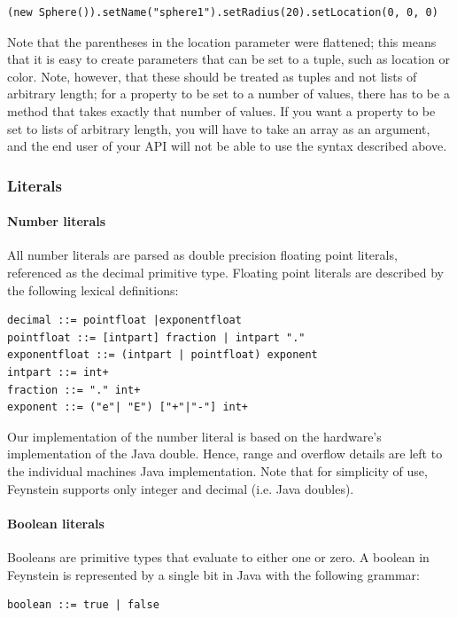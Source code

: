 \begin{verbatim}
(new Sphere()).setName("sphere1").setRadius(20).setLocation(0, 0, 0)
\end{verbatim}

Note that the parentheses in the location parameter were flattened;
this means that it is easy to create parameters that can be set to a
tuple, such as location or color. Note, however, that these should be
treated as tuples and not lists of arbitrary length; for a property to
be set to a number of values, there has to be a method that takes
exactly that number of values. If you want a property to be set to
lists of arbitrary length, you will have to take an array as an
argument, and the end user of your API will not be able to use the
syntax described above.

\subsubsection{Literals}
 
\paragraph{Number literals}
\label{sec:numliterals}
All number literals are parsed as double precision floating point
literals, referenced as the decimal primitive type. Floating point
literals are described by the following lexical definitions:

\begin{verbatim}
decimal ::= pointfloat |exponentfloat
pointfloat ::= [intpart] fraction | intpart "."
exponentfloat ::= (intpart | pointfloat) exponent
intpart ::= int+
fraction ::= "." int+
exponent ::= ("e"| "E") ["+"|"‐"] int+
\end{verbatim}

Our implementation of the number literal is based on the hardware's
implementation of the Java double. Hence, range and overflow details
are left to the individual machines Java implementation. Note that for
simplicity of use, Feynstein supports only integer and decimal
(i.e. Java doubles).
 
\paragraph{Boolean literals}
Booleans are primitive types that evaluate to either one or zero. A
boolean in Feynstein is represented by a single bit in Java with the
following grammar:

\begin{verbatim}
boolean ::= true | false
\end{verbatim}

